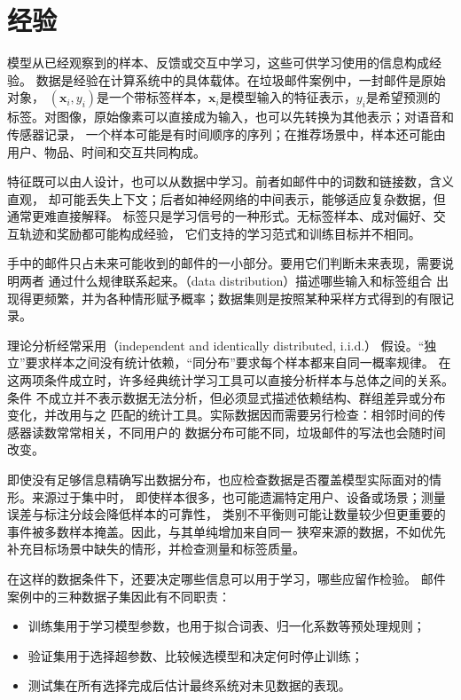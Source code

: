 \section{经验}
\label{sec:machine-learning-data}

模型从已经观察到的样本、反馈或交互中学习，这些可供学习使用的信息构成经验。
数据是经验在计算系统中的具体载体。在垃圾邮件案例中，一封邮件是原始对象，
$(\bm{x}_i,y_i)$是一个带标签样本，$\bm{x}_i$是模型输入的特征表示，$y_i$是希望预测的
标签。对图像，原始像素可以直接成为输入，也可以先转换为其他表示；对语音和传感器记录，
一个样本可能是有时间顺序的序列；在推荐场景中，样本还可能由用户、物品、时间和交互共同构成。

特征既可以由人设计，也可以从数据中学习。前者如邮件中的词数和链接数，含义直观，
却可能丢失上下文；后者如神经网络的中间表示，能够适应复杂数据，但通常更难直接解释。
标签只是学习信号的一种形式。无标签样本、成对偏好、交互轨迹和奖励都可能构成经验，
它们支持的学习范式和训练目标并不相同。

手中的邮件只占未来可能收到的邮件的一小部分。要用它们判断未来表现，需要说明两者
通过什么规律联系起来。（data distribution）描述哪些输入和标签组合
出现得更频繁，并为各种情形赋予概率；数据集则是按照某种采样方式得到的有限记录。

理论分析经常采用（independent and identically distributed, i.i.d.）
假设。“独立”要求样本之间没有统计依赖，“同分布”要求每个样本都来自同一概率规律。
在这两项条件成立时，许多经典统计学习工具可以直接分析样本与总体之间的关系。条件
不成立并不表示数据无法分析，但必须显式描述依赖结构、群组差异或分布变化，并改用与之
匹配的统计工具。实际数据因而需要另行检查：相邻时间的传感器读数常常相关，不同用户的
数据分布可能不同，垃圾邮件的写法也会随时间改变。

即使没有足够信息精确写出数据分布，也应检查数据是否覆盖模型实际面对的情形。来源过于集中时，
即使样本很多，也可能遗漏特定用户、设备或场景；测量误差与标注分歧会降低样本的可靠性，
类别不平衡则可能让数量较少但更重要的事件被多数样本掩盖。因此，与其单纯增加来自同一
狭窄来源的数据，不如优先补充目标场景中缺失的情形，并检查测量和标签质量。

在这样的数据条件下，还要决定哪些信息可以用于学习，哪些应留作检验。
邮件案例中的三种数据子集因此有不同职责：

\begin{itemize}
  \item 训练集用于学习模型参数，也用于拟合词表、归一化系数等预处理规则；
  \item 验证集用于选择超参数、比较候选模型和决定何时停止训练；
  \item 测试集在所有选择完成后估计最终系统对未见数据的表现。
\end{itemize}

